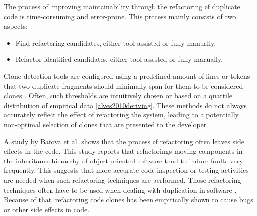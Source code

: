 The process of improving maintainability through the refactoring of duplicate code is time-consuming and error-prone. This process mainly consists of two aspects:
\begin{itemize}
	\item Find refactoring candidates, either tool-assisted or fully manually.
	\item Refactor identified candidates, either tool-assisted or fully manually.
\end{itemize}
Clone detection tools are configured using a predefined amount of lines or tokens that two duplicate fragments should minimally span for them to be considered clones \cite{sajnani2016sourcerercc, svajlenko2016bigcloneeval}. Often, such thresholds are intuitively chosen \cite{li2006cp, roy2009mutation} or based on a quartile distribution of empirical data \ref{alves2010deriving}. These methods do not always accurately reflect the effect of refactoring the system, leading to a potentially non-optimal selection of clones that are presented to the developer.

A study by Batova et al. \cite{bavota2012does} shows that the process of refactoring often leaves side effects in the code. This study reports that refactorings moving components in the inheritance hierarchy of object-oriented software tend to induce faults very frequently. This suggests that more accurate code inspection or testing activities are needed when such refactoring techniques are performed. Those refactoring techniques often have to be used when dealing with duplication in software \cite{fowler2018refactoring, fontana2015duplicated}. Because of that, refactoring code clones has been empirically shown to cause bugs or other side effects in code.

